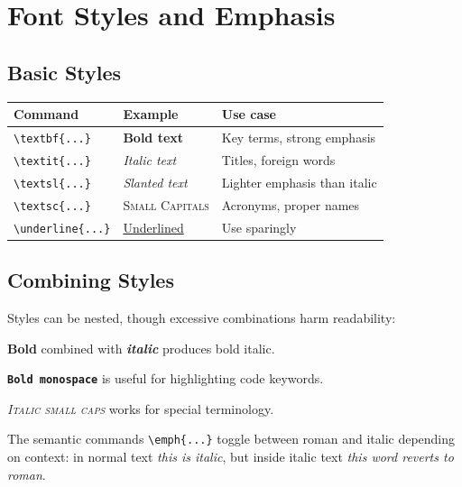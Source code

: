 \documentclass[12pt,a4paper]{article}
\begin{document}

\section{Font Styles and Emphasis}
\label{sec:styles}

\subsection{Basic Styles}

\begin{center}
\begin{tabular}{lll}
\hline
\textbf{Command} & \textbf{Example} & \textbf{Use case} \\
\hline
\verb|\textbf{...}| & \textbf{Bold text} & Key terms, strong emphasis \\
\verb|\textit{...}| & \textit{Italic text} & Titles, foreign words \\
\verb|\textsl{...}| & \textsl{Slanted text} & Lighter emphasis than italic \\
\verb|\textsc{...}| & \textsc{Small Capitals} & Acronyms, proper names \\
\verb|\underline{...}| & \underline{Underlined} & Use sparingly \\
\hline
\end{tabular}
\end{center}

\subsection{Combining Styles}

Styles can be nested, though excessive combinations harm readability:

\medskip
\textbf{Bold} combined with \textbf{\textit{italic}} produces bold italic.

\texttt{\textbf{Bold monospace}} is useful for highlighting code keywords.

\textit{\textsc{Italic small caps}} works for special terminology.

\medskip
\noindent
The semantic commands \verb|\emph{...}| toggle between roman and italic
depending on context: in normal text \emph{this is italic}, but inside
italic text \textit{this word \emph{reverts} to roman}.
\end{document}
